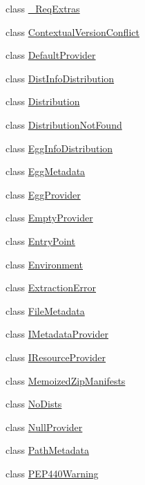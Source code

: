 \begin{DoxyCompactItemize}
\item 
class \hyperlink{classpkg__resources_1_1__ReqExtras}{\+\_\+\+Req\+Extras}
\item 
class \hyperlink{classpkg__resources_1_1ContextualVersionConflict}{Contextual\+Version\+Conflict}
\item 
class \hyperlink{classpkg__resources_1_1DefaultProvider}{Default\+Provider}
\item 
class \hyperlink{classpkg__resources_1_1DistInfoDistribution}{Dist\+Info\+Distribution}
\item 
class \hyperlink{classpkg__resources_1_1Distribution}{Distribution}
\item 
class \hyperlink{classpkg__resources_1_1DistributionNotFound}{Distribution\+Not\+Found}
\item 
class \hyperlink{classpkg__resources_1_1EggInfoDistribution}{Egg\+Info\+Distribution}
\item 
class \hyperlink{classpkg__resources_1_1EggMetadata}{Egg\+Metadata}
\item 
class \hyperlink{classpkg__resources_1_1EggProvider}{Egg\+Provider}
\item 
class \hyperlink{classpkg__resources_1_1EmptyProvider}{Empty\+Provider}
\item 
class \hyperlink{classpkg__resources_1_1EntryPoint}{Entry\+Point}
\item 
class \hyperlink{classpkg__resources_1_1Environment}{Environment}
\item 
class \hyperlink{classpkg__resources_1_1ExtractionError}{Extraction\+Error}
\item 
class \hyperlink{classpkg__resources_1_1FileMetadata}{File\+Metadata}
\item 
class \hyperlink{classpkg__resources_1_1IMetadataProvider}{I\+Metadata\+Provider}
\item 
class \hyperlink{classpkg__resources_1_1IResourceProvider}{I\+Resource\+Provider}
\item 
class \hyperlink{classpkg__resources_1_1MemoizedZipManifests}{Memoized\+Zip\+Manifests}
\item 
class \hyperlink{classpkg__resources_1_1NoDists}{No\+Dists}
\item 
class \hyperlink{classpkg__resources_1_1NullProvider}{Null\+Provider}
\item 
class \hyperlink{classpkg__resources_1_1PathMetadata}{Path\+Metadata}
\item 
class \hyperlink{classpkg__resources_1_1PEP440Warning}{P\+E\+P440\+Warning}

\end{DoxyCompactItemize}
